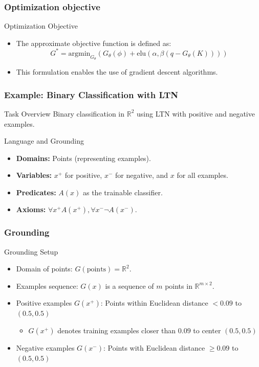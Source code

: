 \documentclass{beamer}
\begin{document}
\begin{frame}
  \frametitle{Optimization objective}
  \begin{block}{Optimization Objective}
    \begin{itemize}
    \item The approximate objective function is defined as:
      \[ G^* = \text{argmin}_{G_\theta} \left( G_\theta(\phi) +
          \text{elu}(\alpha, \beta(q - G_\theta(K))) \right) \]
    \item This formulation enables the use of gradient descent
      algorithms.
    \end{itemize}
  \end{block}
\end{frame}

\begin{frame}
\frametitle{Example: Binary Classification with LTN}
\begin{block}{Task Overview}
Binary classification in \( \mathbb{R}^2 \) using LTN with positive
and negative examples.
\end{block}

\begin{block}{Language and Grounding}
\begin{itemize}
    \item \textbf{Domains:} Points (representing examples).
    \item \textbf{Variables:} \( x^+ \) for positive, \( x^- \) for
      negative, and \( x \) for all examples.
    \item \textbf{Predicates:} \( A(x) \) as the trainable classifier.
    \item \textbf{Axioms:} \( \forall x^+ A(x^+), \forall x^- \neg A(x^-) \).
\end{itemize}
\end{block}
\end{frame}

\begin{frame}
  \frametitle{Grounding}
  \begin{block}{Grounding Setup}
    \begin{itemize}
    \item Domain of points: \( G(\text{points}) = \mathbb{R}^2 \).
    \item Examples sequence: \( G(x) \) is a sequence of \( m \) points in \( \mathbb{R}^{m \times 2} \).
    \item Positive examples \( G(x^+) \): Points within Euclidean
      distance \( < 0.09 \) to \( (0.5, 0.5) \)
      \begin{itemize}
      \item \( G(x^+) \) denotes training examples closer than $0.09$ to center \( (0.5, 0.5) \)
      \end{itemize}
    \item Negative examples \( G(x^-) \): Points with Euclidean distance \( \geq 0.09 \) to \( (0.5, 0.5) \)
\end{itemize}
\end{block}
\end{frame}
\end{document}
